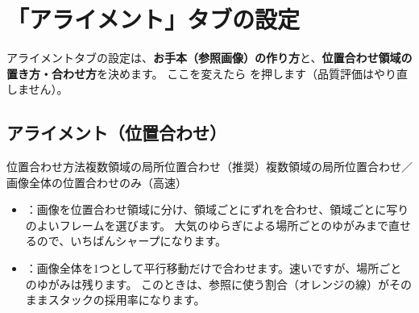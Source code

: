 \chapter{「アライメント」タブの設定}\label{chap:align}

アライメントタブの設定は、\textbf{お手本（参照画像）の作り方}と、\textbf{位置合わせ領域の置き方・合わせ方}を決めます。
ここを変えたら  を押します（品質評価はやり直しません）。

\section{アライメント（位置合わせ）}


\begin{setting}{ 位置合わせ方法}{複数領域の局所位置合わせ（推奨）}{複数領域の局所位置合わせ／画像全体の位置合わせのみ（高速）}
  \begin{itemize}[itemsep=0pt, topsep=2pt]
    \item {}：画像を位置合わせ領域に分け、領域ごとにずれを合わせ、領域ごとに写りのよいフレームを選びます。
          大気のゆらぎによる場所ごとのゆがみまで直せるので、いちばんシャープになります。
    \item {}：画像全体を1つとして平行移動だけで合わせます。速いですが、場所ごとのゆがみは残ります。
          このときは、参照に使う割合（オレンジの線）がそのままスタックの採用率になります。
  \end{itemize}
\end{setting}

